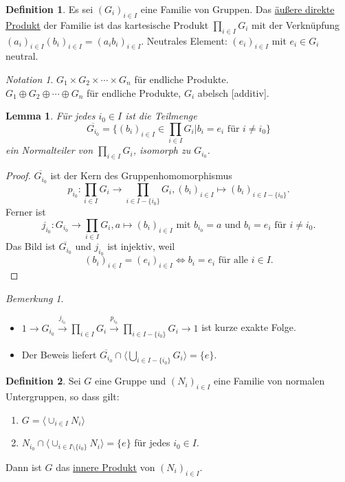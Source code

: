 \documentclass[12pt]{scrartcl}%
\newtheorem{lemma}{Lemma}
\theoremstyle{definition}
\newtheorem*{defn}{Definition}
\theoremstyle{remark}
\newtheorem*{notation}{Notation}
\newtheorem*{nb}{Bemerkung}
\begin{document}
\begin{defn}
	Es sei $(G_i)_{i \in I}$ eine Familie von Gruppen. Das \underline{äußere direkte Produkt} der Familie ist das kartesische Produkt $\prod_{i \in I}G_i$ mit der Verknüpfung $(a_i)_{i \in I} (b_i)_{i \in I} = (a_ib_i)_{i \in I}$. Neutrales Element: $(e_i)_{i \in I}$ mit $e_i \in G_i$ neutral.
\end{defn}

\begin{notation}
	$G_1 \times G_2 \times \dotsb \times G_n$ für endliche Produkte. \\
	$G_1 \oplus G_2 \oplus \dotsb \oplus G_n$ für endliche Produkte, $G_i$ abelsch [additiv].
\end{notation}

\begin{lemma}
	Für jedes $i_0 \in I$ ist die Teilmenge
	$$ \overline{G_{i_0}} = \{(b_i)_{i \in I} \in \prod_{i \in I}G_i | b_i = e_i \text{ für } i \neq i_0\} $$
	ein Normalteiler von $\prod_{i \in I}G_i$, isomorph zu $G_{i_0}$.
\end{lemma}

\begin{proof}
	$\overline{G_{i_0}}$ ist der Kern des Gruppenhomomorphismus
	$$p_{i_0}: \prod_{i \in I}G_i \rightarrow \prod_{i \in I-\{i_0\}}G_i, (b_i)_{i \in I} \mapsto (b_i)_{i \in I-\{i_0\}}.$$
	Ferner ist
	$$j_{i_0}: G_{i_0} \rightarrow \prod_{i \in I}G_i, a \mapsto (b_i)_{i \in I} \text{ mit } b_{i_0}=a \text{ und } b_i = e_i \text{ für } i \neq i_0.$$
	Das Bild ist $\overline{G_{i_0}}$ und $j_{i_0}$ ist injektiv, weil
	$$(b_i)_{i \in I} = (e_i)_{i \in I} \Leftrightarrow b_i = e_i \text{ für alle } i \in I.$$
\end{proof}

\begin{nb}
	\begin{itemize}
		\item $1 \longrightarrow G_{i_0} \stackrel{j_{i_0}}{\longrightarrow} \prod_{i \in I}G_i \stackrel{p_{i_0}}{\longrightarrow} \prod_{i \in I-\{i_0\}}G_i \longrightarrow 1$ ist kurze exakte Folge.
		\item Der Beweis liefert $\overline{G_{i_0}} \cap \langle \bigcup_{i \in I-\{i_0\}}G_i \rangle = \{e\}$. %
	\end{itemize}
\end{nb}

\begin{defn}
    Sei $G$ eine Gruppe und $(N_i)_{i\in I}$ eine Familie von normalen Untergruppen, so dass gilt:

    \begin{enumerate}[label=(\roman*)]
        \item $G=\langle\cup_{i\in I} N_i\rangle$
        \item $N_{i_0} \cap \langle\cup_{i\in I \setminus \{i_0\}} N_i\rangle = \{e\}$ für jedes $i_0\in I$.
    \end{enumerate}

    Dann ist $G$ das \underline{innere Produkt} von $(N_i)_{i\in I}$.
\end{defn}
\end{document}
